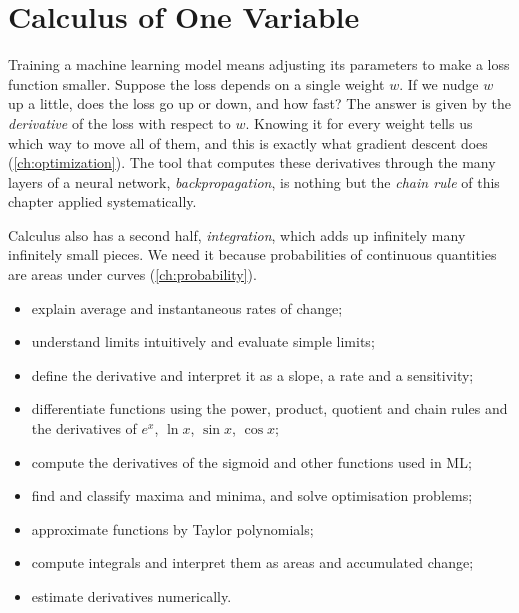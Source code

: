 \chapter{Calculus of One Variable}\label{ch:calculus}

\begin{motivation}
Training a machine learning model means adjusting its parameters to make a
loss function smaller. Suppose the loss depends on a single weight $w$. If we
nudge $w$ up a little, does the loss go up or down, and how fast? The answer
is given by the \emph{derivative} of the loss with respect to $w$. Knowing it
for every weight tells us which way to move all of them, and this is exactly
what gradient descent does (\cref{ch:optimization}). The tool that computes
these derivatives through the many layers of a neural network,
\emph{backpropagation}, is nothing but the \emph{chain rule} of this chapter
applied systematically.

Calculus also has a second half, \emph{integration}, which adds up infinitely
many infinitely small pieces. We need it because probabilities of continuous
quantities are areas under curves (\cref{ch:probability}).
\end{motivation}

\begin{objectives}
\begin{itemize}
  \item explain average and instantaneous rates of change;
  \item understand limits intuitively and evaluate simple limits;
  \item define the derivative and interpret it as a slope, a rate and a
    sensitivity;
  \item differentiate functions using the power, product, quotient and chain
    rules and the derivatives of $e^x$, $\ln x$, $\sin x$, $\cos x$;
  \item compute the derivatives of the sigmoid and other functions used in ML;
  \item find and classify maxima and minima, and solve optimisation problems;
  \item approximate functions by Taylor polynomials;
  \item compute integrals and interpret them as areas and accumulated change;
  \item estimate derivatives numerically.
\end{itemize}
\end{objectives}

